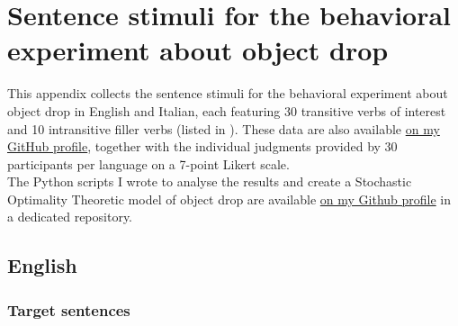 \setchapterpreamble[u]{\margintoc}
\chapter{Sentence stimuli for the behavioral experiment about object drop}

This appendix collects the sentence stimuli for the behavioral experiment about object drop in English and Italian, each featuring 30 transitive verbs of interest and 10 intransitive filler verbs (listed in ). These data are also available \href{https://github.com/giuliacappelli/dissertationData}{on my GitHub profile}, together with the individual judgments provided by 30 participants per language on a 7-point Likert scale.\\
The Python scripts I wrote to analyse the results and create a Stochastic Optimality Theoretic model of object drop are available \href{https://github.com/giuliacappelli/MedinaStochasticOptimalityTheory}{on my Github profile} in a dedicated repository.



\section{English}

\subsection{Target sentences}

